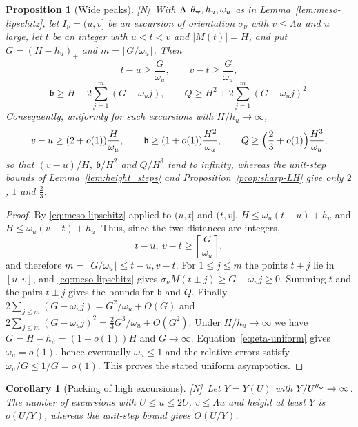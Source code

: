 \documentclass[11pt,reqno]{amsart}
\numberwithin{equation}{section}
\theoremstyle{plain}
\newtheorem{proposition}[theorem]{Proposition}
\newtheorem{corollary}[theorem]{Corollary}
\theoremstyle{definition}
\theoremstyle{remark}
\newcommand{\tagN}{\textup{[N]}}
\begin{document}
\begin{proposition}[Wide peaks]
\label{prop:wide-peaks}
\tagN\ With $\Lambda,\theta_{\rm w},h_u,\omega_u$ as in
Lemma~\ref{lem:meso-lipschitz}, let $I_\nu=(u,v]$ be an excursion of
orientation $\sigma_\nu$ with $v\le\Lambda u$ and $u$ large, let $t$ be an
integer with $u<t<v$ and $|M(t)|=H$, and put $G=(H-h_u)_+$ and
$m=\lfloor G/\omega_u\rfloor$. Then
\begin{equation}
t-u\ge\frac G{\omega_u},\qquad v-t\ge\frac G{\omega_u},
\end{equation}
\begin{equation}
\mathfrak b\ge H+2\sum_{j=1}^m(G-\omega_uj),\qquad
Q\ge H^2+2\sum_{j=1}^m(G-\omega_uj)^2 .
\end{equation}
Consequently, uniformly for such excursions with $H/h_u\to\infty$,
\begin{equation}
v-u\ge(2+o(1))\frac H{\omega_u},\qquad
\mathfrak b\ge(1+o(1))\frac{H^2}{\omega_u},\qquad
Q\ge\Bigl(\frac23+o(1)\Bigr)\frac{H^3}{\omega_u},
\end{equation}
so that $(v-u)/H$, $\mathfrak b/H^2$ and $Q/H^3$ tend to infinity, whereas the
unit-step bounds of Lemma~\ref{lem:height_steps} and
Proposition~\ref{prop:sharp-LH} give only $2$, $1$ and $\frac23$.
\end{proposition}

\begin{proof}
By \eqref{eq:meso-lipschitz} applied to $(u,t]$ and $(t,v]$,
$H\le\omega_u(t-u)+h_u$ and $H\le\omega_u(v-t)+h_u$.  Thus, since the two
distances are integers,
\begin{equation}
 t-u,\ v-t\ge\left\lceil\frac{G}{\omega_u}\right\rceil,
\end{equation}
and therefore $m=\lfloor G/\omega_u\rfloor\le t-u,v-t$.  For
$1\le j\le m$ the points $t\pm j$ lie in $[u,v]$, and \eqref{eq:meso-lipschitz} gives
$\sigma_\nu M(t\pm j)\ge G-\omega_uj\ge0$. Summing $t$ and the pairs $t\pm j$
gives the bounds for $\mathfrak b$ and $Q$. Finally
$2\sum_{j\le m}(G-\omega_uj)=G^2/\omega_u+O(G)$ and
$2\sum_{j\le m}(G-\omega_uj)^2=\frac23G^3/\omega_u+O(G^2)$. Under
$H/h_u\to\infty$ we have $G=H-h_u=(1+o(1))H$ and $G\to\infty$.
Equation~\eqref{eq:eta-uniform} gives $\omega_u=o(1)$, hence eventually
$\omega_u\le1$ and the relative errors satisfy $\omega_u/G\le1/G=o(1)$.
This proves the stated uniform asymptotics.
\end{proof}

\begin{corollary}[Packing of high excursions]
\label{cor:packing}
\tagN\ Let $Y=Y(U)$ with $Y/U^{\theta_{\rm w}}\to\infty$. The number of excursions with
$U\le u\le2U$, $v\le\Lambda u$ and height at least $Y$ is
$o(U/Y)$, whereas the unit-step bound gives $O(U/Y)$.
\end{corollary}
\end{document}
